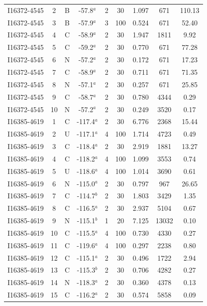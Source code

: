 \begin{table}
\begin{tabular}{ccccccccc}
I16372-4545 & 2 & B & -57.8$^{a}$ & 2 & 30 & 1.097 & 671 & 110.13 \\
I16372-4545 & 3 & B & -57.9$^{a}$ & 3 & 100 & 0.524 & 671 & 52.40 \\
I16372-4545 & 4 & C & -58.9$^{a}$ & 2 & 30 & 1.947 & 1811 & 9.92 \\
I16372-4545 & 5 & C & -59.2$^{a}$ & 2 & 30 & 0.770 & 671 & 77.28 \\
I16372-4545 & 6 & N & -57.2$^{a}$ & 2 & 30 & 0.172 & 671 & 17.23 \\
I16372-4545 & 7 & C & -58.9$^{a}$ & 2 & 30 & 0.711 & 671 & 71.35 \\
I16372-4545 & 8 & N & -57.1$^{a}$ & 2 & 30 & 0.257 & 671 & 25.85 \\
I16372-4545 & 9 & C & -58.7$^{a}$ & 2 & 30 & 0.780 & 4344 & 0.29 \\
I16372-4545 & 10 & N & -57.2$^{a}$ & 2 & 30 & 0.249 & 3520 & 0.17 \\
I16385-4619 & 1 & C & -117.4$^{a}$ & 2 & 30 & 6.776 & 2368 & 15.44 \\
I16385-4619 & 2 & U & -117.1$^{a}$ & 4 & 100 & 1.714 & 4723 & 0.49 \\
I16385-4619 & 3 & C & -118.4$^{a}$ & 2 & 30 & 2.919 & 1881 & 13.27 \\
I16385-4619 & 4 & C & -118.2$^{a}$ & 4 & 100 & 1.099 & 3553 & 0.74 \\
I16385-4619 & 5 & U & -118.6$^{a}$ & 4 & 100 & 1.014 & 3690 & 0.61 \\
I16385-4619 & 6 & N & -115.0$^{a}$ & 2 & 30 & 0.797 & 967 & 26.65 \\
I16385-4619 & 7 & C & -114.7$^{b}$ & 2 & 30 & 1.803 & 3429 & 1.35 \\
I16385-4619 & 8 & C & -116.5$^{a}$ & 2 & 30 & 2.937 & 5104 & 0.67 \\
I16385-4619 & 9 & N & -115.1$^{b}$ & 1 & 20 & 7.125 & 13032 & 0.10 \\
I16385-4619 & 10 & C & -115.5$^{a}$ & 4 & 100 & 0.730 & 4330 & 0.27 \\
I16385-4619 & 11 & C & -119.6$^{a}$ & 4 & 100 & 0.297 & 2238 & 0.80 \\
I16385-4619 & 12 & C & -115.1$^{a}$ & 2 & 30 & 0.496 & 1722 & 2.94 \\
I16385-4619 & 13 & C & -115.3$^{b}$ & 2 & 30 & 0.706 & 4282 & 0.27 \\
I16385-4619 & 14 & N & -118.3$^{a}$ & 2 & 30 & 0.360 & 4378 & 0.13 \\
I16385-4619 & 15 & C & -116.2$^{a}$ & 2 & 30 & 0.574 & 5858 & 0.09 \\

\end{tabular}
\end{table}
